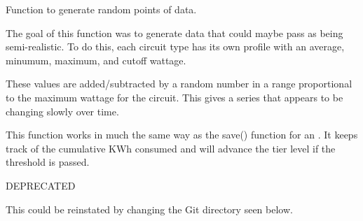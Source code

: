 \documentclass[letterpaper,10pt,english]{sphinxmanual}
\begin{document}
\begin{fulllineitems}
\label{modules/debug:debug.views.echo_args}
\end{fulllineitems}


\begin{fulllineitems}
\label{modules/debug:debug.views.generate_points}
Function to generate random points of data.

The goal of this function was to generate data that could maybe pass
as being semi-realistic. To do this, each circuit type has its own
profile with an average, minumum, maximum, and cutoff wattage.

These values are added/subtracted by a random number in a range
proportional to the maximum wattage for the circuit. This gives
a series that appears to be changing slowly over time.

This function works in much the same way as the save() function
for an {\hyperref[modules/microdata:microdata.models.Event]{\emph{}}}. It keeps track of the
cumulative KWh consumed and will advance the tier level if
the threshold is passed.

\end{fulllineitems}


\begin{fulllineitems}
\label{modules/debug:debug.views.gitupdate}
DEPRECATED

This could be reinstated by changing the Git directory seen below.

\end{fulllineitems}


\begin{fulllineitems}
\label{modules/debug:debug.views.influxdel}
\end{fulllineitems}
\end{document}
